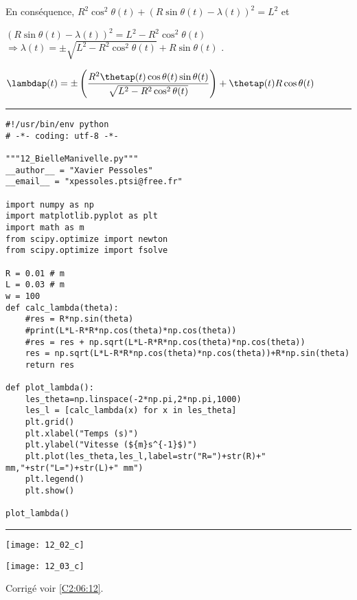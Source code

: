 En conséquence, 
$R^2\cos^2\theta(t)  + \left(R\sin\theta(t)  - \lambda(t)\right)^2 = L^2$ et 

$ \left(R\sin\theta(t)  - \lambda(t)\right)^2 = L^2 - R^2\cos^2\theta(t) $ 
$\Rightarrow    \lambda(t) = \pm\sqrt{L^2 - R^2\cos^2\theta(t)} + R\sin\theta(t) $ .
\else
\fi

\ifprof
$\lambdap(t) = \pm\left( \dfrac{R^2 \thetap(t) \cos\theta(t)\sin\theta(t)}{\sqrt{L^2 - R^2\cos^2\theta(t)}}\right) + \thetap(t)R\cos\theta(t) $ 

\else
\fi


\ifprof
\noindent\hrule
\begin{lstlisting}
#!/usr/bin/env python
# -*- coding: utf-8 -*-

"""12_BielleManivelle.py"""
__author__ = "Xavier Pessoles"
__email__ = "xpessoles.ptsi@free.fr"

import numpy as np
import matplotlib.pyplot as plt
import math as m
from scipy.optimize import newton
from scipy.optimize import fsolve

R = 0.01 # m
L = 0.03 # m
w = 100
def calc_lambda(theta):
    #res = R*np.sin(theta)
    #print(L*L-R*R*np.cos(theta)*np.cos(theta))
    #res = res + np.sqrt(L*L-R*R*np.cos(theta)*np.cos(theta))
    res = np.sqrt(L*L-R*R*np.cos(theta)*np.cos(theta))+R*np.sin(theta)
    return res

def plot_lambda():
    les_theta=np.linspace(-2*np.pi,2*np.pi,1000)
    les_l = [calc_lambda(x) for x in les_theta]
    plt.grid()
    plt.xlabel("Temps (s)")
    plt.ylabel("Vitesse (${m}s^{-1}$)")
    plt.plot(les_theta,les_l,label=str("R=")+str(R)+" mm,"+str("L=")+str(L)+" mm")
    plt.legend()
    plt.show()
    
plot_lambda()
\end{lstlisting}
\noindent\hrule

\begin{center}
\texttt{[image: 12\_02\_c]}
\end{center}
\else
\fi


\ifprof
\begin{center}
\texttt{[image: 12\_03\_c]}
\end{center}
\else
\fi



\ifprof
\else
\begin{flushright}
\footnotesize{Corrigé  voir \ref{C2:06:12}.}
\end{flushright}%
\fi